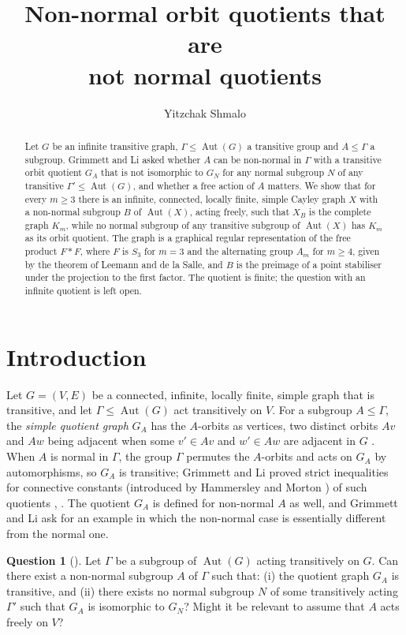 \documentclass[11pt]{amsart}
\title[Non-normal orbit quotients]{Non-normal orbit quotients that are\\ not normal quotients}
\author{Yitzchak Shmalo}
\theoremstyle{definition}
\newtheorem{question}[theorem]{Question}
\theoremstyle{remark}
\DeclareMathOperator{\Aut}{Aut}
\begin{document}
\begin{abstract}
Let $G$ be an infinite transitive graph, $\Gamma\le\Aut(G)$ a transitive group and $A\le\Gamma$ a subgroup. Grimmett and Li asked whether $A$ can be non-normal in $\Gamma$ with a transitive orbit quotient $G_A$ that is not isomorphic to $G_N$ for any normal subgroup $N$ of any transitive $\Gamma'\le\Aut(G)$, and whether a free action of $A$ matters. We show that for every $m\ge3$ there is an infinite, connected, locally finite, simple Cayley graph $X$ with a non-normal subgroup $B$ of $\Aut(X)$, acting freely, such that $X_B$ is the complete graph $K_m$, while no normal subgroup of any transitive subgroup of $\Aut(X)$ has $K_m$ as its orbit quotient. The graph is a graphical regular representation of the free product $F*F$, where $F$ is $S_3$ for $m=3$ and the alternating group $A_m$ for $m\ge4$, given by the theorem of Leemann and de la Salle, and $B$ is the preimage of a point stabiliser under the projection to the first factor. The quotient is finite; the question with an infinite quotient is left open.
\end{abstract}

\maketitle

\section{Introduction}

Let $G=(V,E)$ be a connected, infinite, locally finite, simple graph that is transitive, and let $\Gamma\le\Aut(G)$ act transitively on $V$. For a subgroup $A\le\Gamma$, the \emph{simple quotient graph} $G_A$ has the $A$-orbits as vertices, two distinct orbits $Av$ and $Aw$ being adjacent when some $v'\in Av$ and $w'\in Aw$ are adjacent in $G$ \cite[Sect.~4.2]{GL}. When $A$ is normal in $\Gamma$, the group $\Gamma$ permutes the $A$-orbits and acts on $G_A$ by automorphisms, so $G_A$ is transitive; Grimmett and Li proved strict inequalities for connective constants (introduced by Hammersley and Morton \cite{HM54}) of such quotients \cite[Thm.~4.2]{GL}, \cite{GL13}. The quotient $G_A$ is defined for non-normal $A$ as well, and Grimmett and Li ask for an example in which the non-normal case is essentially different from the normal one.

\begin{question}[{\cite[Question~4.5]{GL}}]\label{q:GL}
Let $\Gamma$ be a subgroup of $\Aut(G)$ acting transitively on $G$. Can there exist a non-normal subgroup $A$ of $\Gamma$ such that: (i) the quotient graph $G_A$ is transitive, and (ii) there exists no normal subgroup $N$ of some transitively acting $\Gamma'$ such that $G_A$ is isomorphic to $G_N$? Might it be relevant to assume that $A$ acts freely on $V$?
\end{question}
\end{document}
